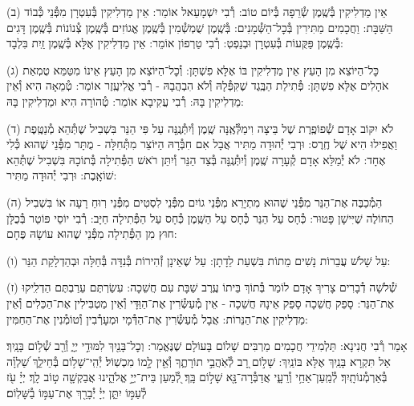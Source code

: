 \documentclass[twoside, openany, parskip=half, 11pt]{book}
\begin{document}
(ב) אֵין מַדְלִיקִין בְּ֯שֶֽׁמֶן שְׂ֯רֵפָה בְּ֯יוֹם טוֹב: רְ֯בִי יִשְׁמָעֵאל אוֹמֵר: אֵין מַדְלִיקִין בְּ֯עִטְרָן מִפְּ֯נֵי כְּ֯בוֹד הַשַּׁבָּת: וַחֲכָמִים מַתִּירִין בְּ֯כׇל־הַשְּׁ֯מָנִים: בְּ֯שֶֽׁמֶן שֻׁמְשְׁ֯מִין בְּ֯שֶֽׁמֶן אֱגוֹזִים בְּ֯שֶֽׁמֶן צְ֯נוֹנוֹת בְּ֯שֶֽׁמֶן דָּגִים בְּ֯שֶֽׁמֶן פַּקֻּעוֹת בְּ֯עִטְרָן וּבְנֵפְטְ: רְ֯בִי טַרְפוֹן אוֹמֵר: אֵין מַדְלִיקִין אֶלָּא בְּ֯שֶֽׁמֶן זַֽיִת בִּלְבָד:

(ג) כׇּל־הַיּוֹצֵא מִן הָעֵץ אֵין מַדְלִיקִין בּוֹ אֶלָּא פִשְׁתָּן: וְ֯כׇל־הַיּוֹצֵא מִן הָעֵץ אֵינוֹ מִטַּמֵּא טֻמְאַת אֹהָלִים אֶלָּא פִשְׁתָּן: פְּ֯תִילַת הַבֶּֽגֶד שֶׁקִּפְּ֯לָהּ וְ֯לֹא הִבְהֲבָהּ - רְ֯בִי אֱלִיעֶֽזֶר אוֹמֵר: טְ֯מֵאָה הִיא וְ֯אֵין מַדְלִיקִין בָּהּ: רְ֯בִי עֲקִיבָא אוֹמֵר: טְ֯הוֹרָה הִיא וּמַדְלִיקִין בָּהּ:

(ד) לֹא יִקּוֹב אָדָם שְׁ֯פוֹפֶֽרֶת שֶׁל בֵּיצָה וִימַלְּ֯אֶֽנָּה שֶֽׁמֶן וְ֯יִתְּ֯נֶֽנָּה עַל פִּי הַנֵּר בִּשְׁבִיל שֶׁתְּ֯הֵא מְ֯נַטֶּֽפֶת וַאֲפִילוּ הִיא שֶׁל חֶֽרֶס: וּרְבִי יְ֯הוּדָה מַתִּיר אֲבָל אִם חִבְּ֯רָהּ הַיּוֹצֵר מִתְּ֯חִלָּה - מֻתָּר מִפְּ֯נֵי שֶׁהוּא כְּ֯לִי אֶחָד: לֹא יְ֯מַלֵּא אָדָם קְ֯עָרָה שֶֽׁמֶן וְ֯יִתְּ֯נֶֽנָּה בְּ֯צַד הַנֵּר וְ֯יִתֵּן רֹאשׁ הַפְּ֯תִילָה בְּ֯תוֹכָהּ בִּשְׁבִיל שֶׁתְּ֯הֵא שׁוֹאָֽבֶת: וּרְבִי יְ֯הוּדָה מַתִּיר:

(ה) הַמְ֯כַבֶּה אֶת־הַנֵּר מִפְּ֯נֵי שֶׁהוּא מִתְיָרֵא מִפְּ֯נֵי גוֹיִם מִפְּ֯נֵי לִסְטִים מִפְּ֯נֵי רֽוּחַ רָעָה אוֹ בִּשְׁבִיל הַחוֹלֶה שֶׁיִּישָׁן פָּטוּר: כְּ֯חָס עַל הַנֵּר כְּ֯חָס עַל הַשֶּֽׁמֶן כְּ֯חָס עַל הַפְּ֯תִילָה חַיָּב: רְ֯בִי יוֹסֵי פּוֹטֵר בְּ֯כֻלָּן חוּץ מִן הַפְּ֯תִילָה מִפְּ֯נֵי שֶׁהוּא עוֹשָׂהּ פֶּחָם:

(ו) עַל שָׁלֹשׁ עֲבֵרוֹת נָשִׁים מֵתוֹת בִּשְׁעַת לֵדָתָן: עַל שֶׁאֵינָן זְ֯הִירוֹת בְּ֯נִדָּה בְּ֯חַלָּה וּבְהַדְלָקַת הַנֵּר:

(ז) שְׁ֯לֹשָׁה דְ֯בָרִים צָרִיךְ אָדָם לוֹמַר בְּ֯תוֹךְ בֵּיתוֹ עֶֽרֶב שַׁבָּת עִם חֲשֵׁכָה: עִשַׂרְתֶּם עֵרַבְתֶּם הַדְלִֽיקוּ אֶת־הַנֵּר: סָפֵק חֲשֵׁכָה סָפֵק אֵינָהּ חֲשֵׁכָה - אֵין מְ֯עַשְּׂ֯רִין אֶת־הַוַּדָּי וְ֯אֵין מַטְבִּילִין אֶת־הַכֵּלִים וְ֯אֵין מַדְלִיקִין אֶת־הַנֵּרוֹת: אֲבָל מְ֯עַשְּׂ֯רִין אֶת־הַדְּ֯מָי וּמְעָרְ֯בִין וְ֯טוֹמְ֯נִין אֶת־הַחַמִּין:


 
אָמַר רְ֯בִי חֲנִינָא: תַּלְמִידֵי חֲכָמִים מַרְבִּים שָׁלוֹם בָּעוֹלָם שֶׁנֶּאֱמַר:
וְכׇל־בָּנַ֖יִךְ לִמּוּדֵ֣י יְיָ֑ וְ֯רַ֖ב שְׁ֯ל֥וֹם בָּנָֽיִךְ׃ אַל תִּקְרָא בָּנַֽיִךְ אֶלָּא בּוֹנַֽיִךְ: שָׁל֣וֹם רָ֭ב לְ֯אֹֽהֲבֵ֣י תוֹרָתֶ֑ךָ וְ֯אֵ֖ין לָ֣מוֹ מִכְשֽׁוֹל׃ יְ֯הִֽי־שָׁל֥וֹם בְּ֯חֵילֵ֑ךְ שַׁ֝לְוָ֗ה בְּ֯אַרְמְ֯נוֹתָֽיִךְ׃  לְ֯מַֽעַן־אַחַ֥י וְ֯רֵעָ֑י אֲדַבְּ֯רָה־נָּ֖א שָׁל֣וֹם בָּֽךְ׃ לְ֭֯מַעַן בֵּית־יְיָ֣ אֱלֹהֵ֑ינוּ אֲבַקְשָׁ֖ה ט֣וֹב לָֽךְ׃
יְיָ֗ עֹ֖ז לְ֯עַמּ֣וֹ יִתֵּ֑ן יְיָ֓ יְ֯בָרֵ֖ךְ אֶת־עַמּ֣וֹ בַ֯שָּׁלֽוֹם׃
\end{document}
